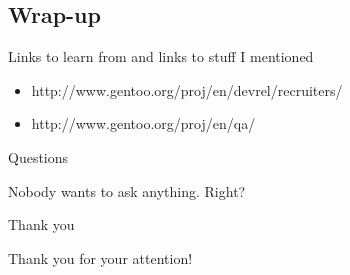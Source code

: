 \documentclass{beamer}
\begin{document}
\subsection{Wrap-up}

\begin{frame}{Links to learn from and links to stuff I mentioned}
	\begin{itemize}
		\item http://www.gentoo.org/proj/en/devrel/recruiters/
		\item http://www.gentoo.org/proj/en/qa/
	\end{itemize}
\end{frame}

\begin{frame}{Questions}
	\begin{center}Nobody wants to ask anything. Right?\end{center}
\end{frame}

\begin{frame}{Thank you}
	\begin{center}Thank you for your attention!\end{center}
\end{frame}
\end{document}
